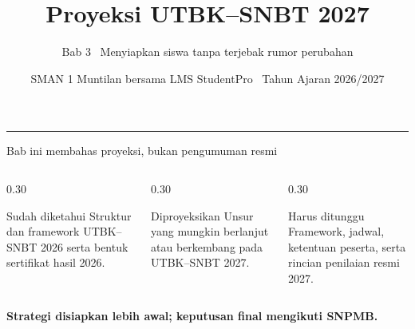 \renewcommand{\currentchapter}{3}
\title{Proyeksi UTBK--SNBT 2027}
\subtitle{Bab 3 \textbar\ Menyiapkan siswa tanpa terjebak rumor perubahan}
\date{SMAN 1 Muntilan bersama LMS StudentPro \textbar\ Tahun Ajaran 2026/2027}

\begingroup
{}
\begin{frame}[plain]
  \vspace{0.65cm}
  \vspace{0.08cm}
  {\color{StudentWhite}\inserttitle\par}
  \vspace{0.38cm}
  {\color{StudentSoft}\insertsubtitle\par}
  \vfill
  {\color{StudentGold}\rule{2.3cm}{2.5pt}}\par
  \vspace{0.20cm}
  {\color{StudentWhite}\insertauthor}\par
  {\color{StudentSoft}\insertdate}
  \vspace{0.42cm}
\end{frame}
\endgroup

\begin{frame}{Bab ini membahas proyeksi, bukan pengumuman resmi}
  \begin{columns}[T,onlytextwidth]
    \begin{column}{0.30\textwidth}
      \begin{block}{Sudah diketahui}
        Struktur dan framework UTBK--SNBT 2026 serta bentuk sertifikat hasil 2026.
      \end{block}
    \end{column}
    \begin{column}{0.30\textwidth}
      \begin{block}{Diproyeksikan}
        Unsur yang mungkin berlanjut atau berkembang pada UTBK--SNBT 2027.
      \end{block}
    \end{column}
    \begin{column}{0.30\textwidth}
      \begin{block}{Harus ditunggu}
        Framework, jadwal, ketentuan peserta, serta rincian penilaian resmi 2027.
      \end{block}
    \end{column}
  \end{columns}
  \vspace{0.28cm}
  \centering
  {\color{StudentNavy}\bfseries\fontsize{15}{18}\selectfont Strategi disiapkan lebih awal; keputusan final mengikuti SNPMB.}
\end{frame}

